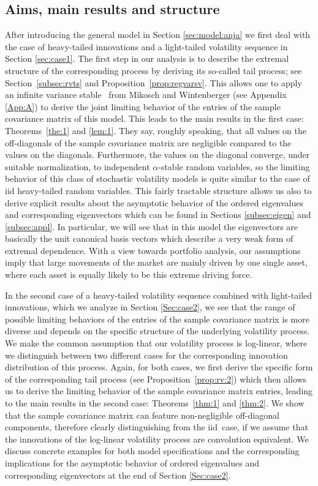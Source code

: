 \subsection{Aims, main results and structure} 
After introducing the general model in Section \ref{sec:model:anja} we
first deal with the case of heavy-tailed innovations and a
light-tailed volatility sequence in Section \ref{sec:case1}. The first
step in our analysis is to describe the extremal structure of the
corresponding process by deriving its so-called tail process; see 
Section~\ref{subsec:rvts} and Proposition~\ref{prop:regvarsv}. This
allows one to apply an infinite variance stable \clt\  from Mikosch and Wintenberger 
\cite{mikosch:wintenberger:2016} (see Appendix \ref{App:A}) to derive
the joint limiting behavior of the entries of the sample covariance
matrix of this model. This leads to the main results  
in the first case: Theorems~\ref{the:1} and \ref{lem:1}. They say,
roughly speaking, that all values on the off-diagonals of the sample
covariance matrix are negligible compared to the values on the
diagonals. Furthermore, the values on the diagonal converge, under
suitable normalization, to independent $\alpha$-stable random
variables, so the limiting behavior of this class of stochastic
volatility  models is quite similar to the case of iid heavy-tailed
random variables. This fairly tractable structure allows us also to
derive explicit results about the asymptotic behavior of the ordered
eigenvalues and corresponding eigenvectors which can be
found in Sections \ref{subsec:eigen} and \ref{subsec:appl}. In
particular, we will see that in this model  
the eigenvectors are basically the unit canonical basis vectors which
describe a very weak form of extremal dependence. With a view towards
portfolio analysis, our assumptions imply that large movements of the
market are mainly driven by one single asset, where each asset is
equally likely to be this extreme driving force.  

In the second case of a heavy-tailed volatility sequence combined with
light-tailed innovations, which we analyze in Section \ref{Sec:case2},
we see that the range of possible limiting behaviors of the entries of
the sample covariance matrix is more diverse and depends on the
specific structure of the underlying volatility process. We make the
common assumption that our volatility process is log-linear, where we
distinguish between two different cases for the corresponding
innovation distribution of this process. Again, for both cases, we
first derive the specific form of the corresponding tail process (see
Proposition~\ref{prop:rv:2})
which then allows us to derive the limiting behavior of the sample
covariance matrix entries, leading to the main results in the second
case: Theorems~\ref{thm:1} and \ref{thm:2}. We show that the sample
covariance matrix can feature non-negligible off-diagonal components,
therefore clearly distinguishing from the iid\ case, if we assume that
the innovations of the log-linear volatility process are convolution
equivalent. We discuss concrete examples for both model specifications
and the corresponding implications for the asymptotic behavior of
ordered eigenvalues and corresponding eigenvectors at the end of
Section \ref{Sec:case2}.

